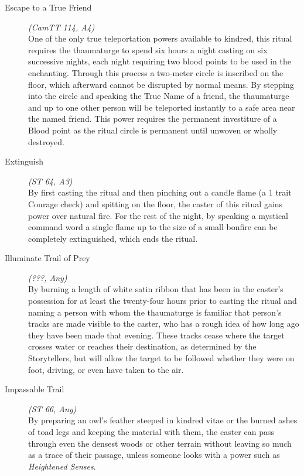\begin{description}
	\item[Escape to a True Friend] \emph{(CamTT 114, A4)} \hfill \\
	One of the only true teleportation powers available to kindred, this ritual requires the thaumaturge to spend six 
	hours a night casting on six successive nights, each night requiring two blood points to be used in the enchanting.  
	Through this process a two-meter circle is inscribed on the floor, which afterward cannot be disrupted by normal 
	means.  By stepping into the circle and speaking the True Name of a friend, the thaumaturge and up to one other person 
	will be teleported instantly to a safe area near the named friend.  This power requires the permanent investiture of a 
	Blood point as the ritual circle is permanent until unwoven or wholly destroyed. \\
	
	\item[Extinguish] \emph{(ST 64, A3)} \hfill \\
	By first casting the ritual and then pinching out a candle flame (a 1 trait Courage check) and spitting on the floor, 
	the caster of this ritual gains power over natural fire. For the rest of the night, by speaking a mystical command word 
	a single flame up to the size of a small bonfire can be completely extinguished, which ends the ritual. \\
	
	\item[Illuminate Trail of Prey] \emph{(???, Any)} \hfill \\
	By burning a length of white satin ribbon that has been in the caster's possession for at least the twenty-four hours 
	prior to casting the ritual and naming a person with whom the thaumaturge is familiar that person's tracks are made 
	visible to the caster, who has a rough idea of how long ago they have been made that evening.  These tracks cease 
	where the target crosses water or reaches their destination, as determined by the Storytellers, but will allow the 
	target to be followed whether they were on foot, driving, or even have taken to the air. \\
	
	\item[Impassable Trail] \emph{(ST 66, Any)} \hfill \\
	By preparing an owl's feather steeped in kindred vitae or the burned ashes of toad legs and keeping the material with 
	them, the caster can pass through even the densest woods or other terrain without leaving so much as a trace of their 
	passage, unless someone looks with a power such as \emph{Heightened Senses}. \\
	

\end{description}
